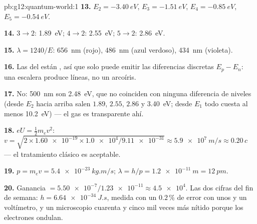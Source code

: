 \begin{solution}{pb:g12:quantum-world:1}
\textbf{13.} $E_2 = \qty{-3.40}{eV}$, $E_3 = \qty{-1.51}{eV}$,
$E_4 = \qty{-0.85}{eV}$, $E_5 = \qty{-0.54}{eV}$.

\textbf{14.} $3 \to 2$: \qty{1.89}{eV}; $4 \to 2$: \qty{2.55}{eV};
$5 \to 2$: \qty{2.86}{eV}.

\textbf{15.} $\lambda = 1240/E$: \qty{656}{nm} (rojo), \qty{486}{nm}
(azul verdoso), \qty{434}{nm} (violeta).

\textbf{16.} Las  del  están , así que solo
puede emitir las diferencias discretas $E_p - E_n$: una escalera produce
líneas, no un arcoíris.

\textbf{17.} No: \qty{500}{nm} son \qty{2.48}{eV}, que no coinciden con
ninguna diferencia de niveles (desde $E_2$ hacia arriba salen $1.89$,
$2.55$, $2.86$ y \qty{3.40}{eV}; desde $E_1$ todo cuesta al menos
\qty{10.2}{eV}) --- el gas es transparente ahí.

\textbf{18.} $eU = \tfrac12 m_e v^2$:
$v = \sqrt{2 \times \num{1.60e-19} \times \num{1.0e4}/\num{9.11e-31}}
\approx \qty{5.9e7}{m/s} \approx 0.20\,c$ --- el tratamiento clásico es
aceptable.

\textbf{19.} $p = m_e v = \qty{5.4e-23}{kg.m/s}$;
$\lambda = h/p = \qty{1.2e-11}{m} = \qty{12}{pm}$.

\textbf{20.} Ganancia $= \num{5.50e-7}/\num{1.23e-11} \approx
\num{4.5e4}$. Las dos cifras del fin de semana: $h = \qty{6.64e-34}{J.s}$,
medida con un $0.2\,\%$ de error con unos  y un voltímetro, y un
microscopio cuarenta y cinco mil veces más nítido porque los electrones
ondulan.
\end{solution}
